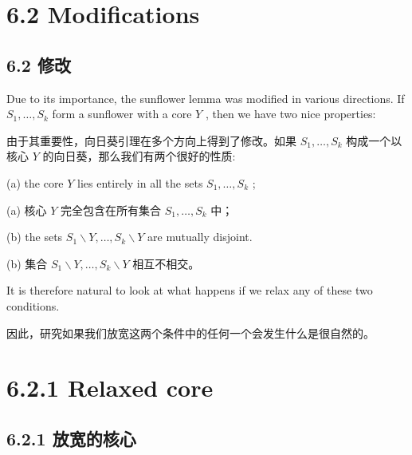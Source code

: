 \documentclass[10pt]{article}
\begin{document}
\section*{6.2 Modifications}

\begin{tcolorbox}\relax
\section*{6.2 修改}
\end{tcolorbox}

Due to its importance, the sunflower lemma was modified in various directions. If \({S}_{1},\ldots ,{S}_{k}\) form a sunflower with a core \(Y\) , then we have two nice properties:

\begin{tcolorbox}\relax
由于其重要性，向日葵引理在多个方向上得到了修改。如果 \({S}_{1},\ldots ,{S}_{k}\) 构成一个以核心 \(Y\) 的向日葵，那么我们有两个很好的性质:
\end{tcolorbox}

(a) the core \(Y\) lies entirely in all the sets \({S}_{1},\ldots ,{S}_{k}\) ;

\begin{tcolorbox}\relax
(a) 核心 \(Y\) 完全包含在所有集合 \({S}_{1},\ldots ,{S}_{k}\) 中；
\end{tcolorbox}

(b) the sets \({S}_{1} \smallsetminus  Y,\ldots ,{S}_{k} \smallsetminus  Y\) are mutually disjoint.

\begin{tcolorbox}\relax
(b) 集合 \({S}_{1} \smallsetminus  Y,\ldots ,{S}_{k} \smallsetminus  Y\) 相互不相交。
\end{tcolorbox}

It is therefore natural to look at what happens if we relax any of these two conditions.

\begin{tcolorbox}\relax
因此，研究如果我们放宽这两个条件中的任何一个会发生什么是很自然的。
\end{tcolorbox}

\section*{6.2.1 Relaxed core}

\begin{tcolorbox}\relax
\section*{6.2.1 放宽的核心}
\end{tcolorbox}
\end{document}
